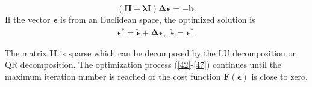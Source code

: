 \documentclass[journal]{IEEEtran}
\begin{document}
\begin{equation}\label{46}
\mathbf { (H + \lambda I)\Delta \epsilon = -b }.
\end{equation}
If the vector $\mathbf{\epsilon}$ is from an Euclidean space, the optimized solution is
\begin{equation}\label{47}
\begin{array}{ll}
\mathbf { \epsilon^{\ast}= \widetilde \epsilon + \Delta \epsilon}, \ \
\mathbf {\widetilde \epsilon = \epsilon^{\ast}}.
\end{array}
\end{equation}

The matrix $\mathbf H$ is sparse which can be decomposed by the LU decomposition or QR decomposition.
The optimization process (\eqref{42}-\eqref{47}) continues until the maximum iteration number is reached or the cost function $\mathbf {F(\epsilon)}$ is close to zero.
\end{document}
